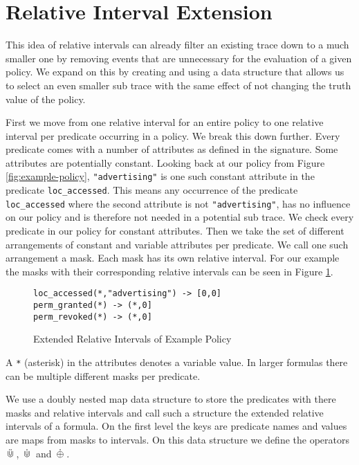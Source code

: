 \section{Relative Interval Extension}

This idea of relative intervals can already filter an existing trace down to a much smaller one by removing events that are unnecessary for the evaluation of a given policy.
We expand on this by creating and using a data structure that allows us to select an even smaller sub trace with the same effect of not changing the truth value of the policy.

First we move from one relative interval for an entire policy to one relative interval per predicate occurring in a policy.
We break this down further.
Every predicate comes with a number of attributes as defined in the signature.
Some attributes are potentially constant.
Looking back at our policy from Figure \ref{fig:example-policy}, \texttt{"advertising"} is one such constant attribute in the predicate \texttt{loc\_accessed}.
This means any occurrence of the predicate \texttt{loc\_accessed} where the second attribute is not \texttt{"advertising"}, has no influence on our policy and is therefore not needed in a potential sub trace.
We check every predicate in our policy for constant attributes.
Then we take the set of different arrangements of constant and variable attributes per predicate.
We call one such arrangement a mask.
Each mask has its own relative interval.
For our example the masks with their corresponding relative intervals can be seen in Figure \ref{fig:example-ext-intervals}.

\begin{figure}[H]
    \label{fig:example-ext-intervals}
\begin{verbatim}
loc_accessed(*,"advertising") -> [0,0]
perm_granted(*) -> (*,0]
perm_revoked(*) -> (*,0]
\end{verbatim}
    \caption{Extended Relative Intervals of Example Policy}
\end{figure}

A \texttt{*} (asterisk) in the attributes denotes a variable value.
In larger formulas there can be multiple different masks per predicate.

We use a doubly nested map data structure to store the predicates with there masks and relative intervals and call such a structure the extended relative intervals of a formula.
On the first level the keys are predicate names and values are maps from masks to intervals.
On this data structure we define the operators $\,\ddot{\Cup}\,$, $\,\dot{\Cup}\,$ and $\,\dot{\oplus}\,$.

